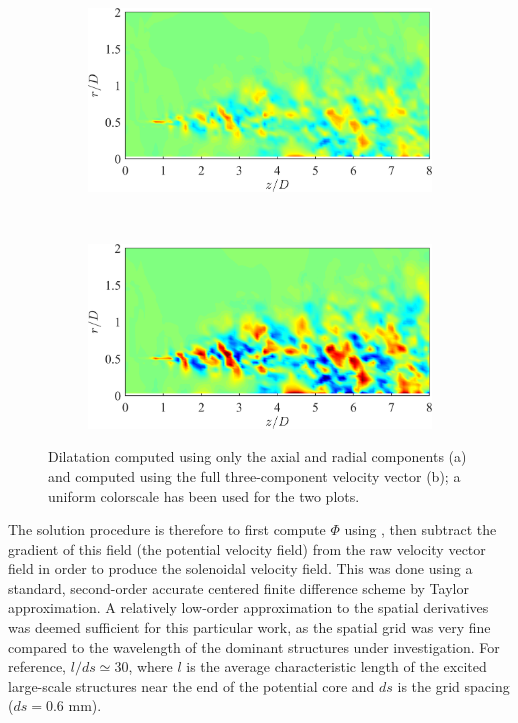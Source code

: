 \begin{figure}
	\centering
	\begin{subfigure}{0.75\textwidth}
		\centering
		\includegraphics[width=0.95\linewidth]{Figures/LES_2CDil.png}
		\caption{}
	\end{subfigure}\\
	\begin{subfigure}{0.75\textwidth}
		\centering
		\includegraphics[width=0.95\linewidth]{Figures/LES_3CDil.png}
		\caption{}
	\end{subfigure}
	\caption{Dilatation computed using only the axial and radial components (a) and computed using the full three-component velocity vector (b); a uniform colorscale has been used for the two plots.}
	\label{fig:LES_streamwise_dil}
\end{figure}

The solution procedure is therefore to first compute $\Phi$ using , then subtract the gradient of this field (the potential velocity field) from the raw velocity vector field in order to produce the solenoidal velocity field. 
This was done using a standard, second-order accurate centered finite difference scheme by Taylor approximation.
A relatively low-order approximation to the spatial derivatives was deemed sufficient for this particular work, as the spatial grid was very fine compared to the wavelength of the dominant structures under investigation.
For reference, $l/ds \simeq 30$, where $l$ is the average characteristic length of the excited large-scale structures near the end of the potential core and $ds$ is the grid spacing ($ds = 0.6$ mm).

